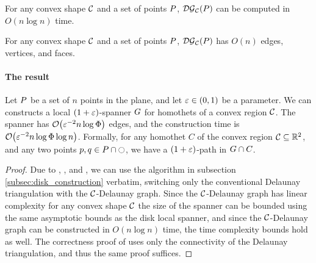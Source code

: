 \documentclass[12pt]{article}%
\begin{document}
\begin{theorem}
	For any convex shape $\mathcal{C}$ and a set of points $P$, $\mathcal{DG}_{\mathcal{C}}(P)$ can be computed in $O(n \log n)$ time.
\end{theorem}

\begin{lemma}
	For any convex shape $\mathcal{C}$ and a set of points $P$, $\mathcal{DG}_{\mathcal{C}}(P)$ has $O(n)$ edges, vertices, and faces.
\end{lemma}


\paragraph{The result}
\begin{theorem}
	Let $P$ be a set of $n$ points in the plane, and let
	$\varepsilon \in (0,1)$ be a parameter. We can constructs a
	local $(1+\varepsilon)$-spanner $G$ for homothets of a convex region $\mathcal{C}$. The spanner has $\Of\pth{ \eps^{-2} n\log \spread }$ edges, and the construction time
	is $\Of\pth{ \eps^{-2} n\log \spread \log n }$.  Formally, for any homothet $C$ of the convex region
	$\mathcal{C}\subseteq \mathbb{R}^2$, and any two points
	$p, q \in P \cap \ocircle$, we have a $(1+\varepsilon)$-path in
	$G \cap {C}$.
\end{theorem}

\begin{proof}
	Due to , , and , we can use the algorithm in subsection \ref{subsec:disk_construction} verbatim, switching only the conventional Delaunay triangulation with the $\mathcal{C}$-Delaunay graph. Since the $\mathcal{C}$-Delaunay graph has linear complexity for any convex shape $\mathcal{C}$ the size of the spanner can be bounded using the same asymptotic bounds as the disk local spanner, and since the $\mathcal{C}$-Delaunay graph can be constructed in $O(n\log n)$ time, the time complexity bounds hold as well. The correctness proof of  uses only the connectivity of the Delaunay triangulation, and thus the same proof suffices.
	

\end{proof}



\end{document}
